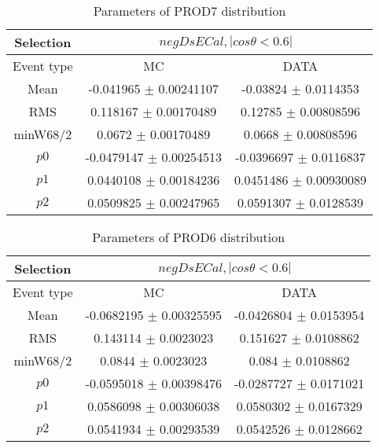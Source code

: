 \documentclass[a4paper,12pt]{article}
\begin{document}
\begin{table}[htbp]
\begin{center}
\begin{tabular}{|c|c|c|}
        \hline
        Selection & \multicolumn{2}{|c|}{$negDsECal, |cos\theta<0.6|$}  \\ \hline
        Event type & MC & DATA \\ 
        \hline
        Mean & -0.041965 $\pm$ 0.00241107 & -0.03824 $\pm$ 0.0114353 \\ 
        \hline 
        RMS & 0.118167 $\pm$ 0.00170489 & 0.12785 $\pm$ 0.00808596 \\ 
        \hline 
        minW68/2 & 0.0672 $\pm$ 0.00170489 & 0.0668 $\pm$ 0.00808596 \\ 
        \hline 
        $p0$ & -0.0479147 $\pm$ 0.00254513 & -0.0396697 $\pm$ 0.0116837 \\ 
        \hline 
        $p1$ & 0.0440108 $\pm$ 0.00184236 & 0.0451486 $\pm$ 0.00930089 \\ 
        \hline 
        $p2$ & 0.0509825 $\pm$ 0.00247965 & 0.0591307 $\pm$ 0.0128539 \\ 
        \hline 
\end{tabular}
\caption{Parameters of PROD7 distribution } \vspace{0.2in}
\label{xxx}
\end{center}
\end{table}
\begin{table}[htbp]
\begin{center}
\begin{tabular}{|c|c|c|}
        \hline
        Selection & \multicolumn{2}{|c|}{$negDsECal, |cos\theta<0.6|$}  \\ \hline
        Event type & MC & DATA \\ 
        \hline
        Mean & -0.0682195 $\pm$ 0.00325595 & -0.0426804 $\pm$ 0.0153954 \\ 
        \hline 
        RMS & 0.143114 $\pm$ 0.0023023 & 0.151627 $\pm$ 0.0108862 \\ 
        \hline 
        minW68/2 & 0.0844 $\pm$ 0.0023023 & 0.084 $\pm$ 0.0108862 \\ 
        \hline 
        $p0$ & -0.0595018 $\pm$ 0.00398476 & -0.0287727 $\pm$ 0.0171021 \\ 
        \hline 
        $p1$ & 0.0586098 $\pm$ 0.00306038 & 0.0580302 $\pm$ 0.0167329 \\ 
        \hline 
        $p2$ & 0.0541934 $\pm$ 0.00293539 & 0.0542526 $\pm$ 0.0128662 \\ 
        \hline 
\end{tabular}
\caption{Parameters of PROD6 distribution } \vspace{0.2in}
\label{xxx}
\end{center}
\end{table}
\end{document}
